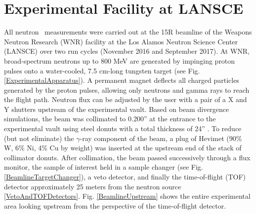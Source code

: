 \section{Experimental Facility at LANSCE}
All neutron \tot\ measurements were carried out at the 15R
beamline of the Weapons Neutron Research (WNR) facility at the Los Alamos
Neutron Science Center (LANSCE) over two run cycles (November 2016 and
September 2017). At WNR, broad-spectrum neutrons up
to 800 MeV are generated by impinging proton pulses onto a water-cooled, 7.5
cm-long tungsten target (see Fig. \ref{ExperimentalApparatus}). A 
permanent magnet deflects all charged particles generated by the proton pulses, 
allowing only neutrons and gamma rays to reach the flight path. Neutron flux can be
adjusted by the user with a pair of a X and Y shutters upstream of the
experimental vault. Based on beam divergence
simulations, the beam was collimated to 0.200'' at  the entrance to the
experimental vault using steel donuts with a total thickness of 24'' .
To reduce (but not eliminate) the $\gamma$-ray component of the beam,
a plug of Hevimet (90\% W, 6\% 
Ni, 4\% Cu by weight) was inserted at the upstream end of the
stack of collimator donuts. After collimation, the beam passed successively through a flux 
monitor, the sample of interest held in a sample changer (see Fig.
\ref{BeamlineTargetChanger}), a veto detector, and finally the 
time-of-flight (TOF) detector approximately 25 meters from the neutron source
\ref{VetoAndTOFDetectors}. Fig. \ref{BeamlineUpstream} shows the entire
experimental area looking upstream from the perspective of the time-of-flight
detector.

